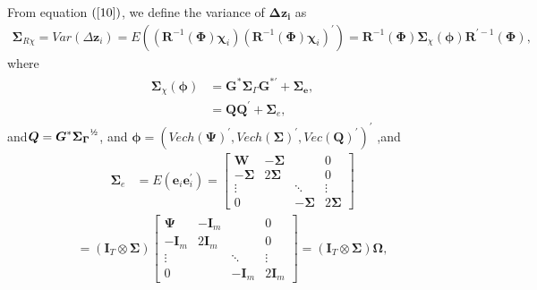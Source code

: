 \documentclass[12pt,a4paper,hyperref]{article}
\begin{document}
From equation $(\ref{10})$, we define the variance of $\boldsymbol{\Delta z_{i}}$ as
\begin{align}
\boldsymbol{\Sigma}_{R\chi}=Var(\Delta \boldsymbol{z}_{i})=E\left(\left( \boldsymbol{R}^{-1}(\boldsymbol{\Phi}) \boldsymbol{\chi}_{i}\right)\left( \boldsymbol{R}^{-1}(\boldsymbol{\Phi})\boldsymbol{\chi}_{i}\right)^{'}\right)=\boldsymbol{R}^{-1}(\boldsymbol{\Phi}) \boldsymbol{\Sigma}_{\chi}(\boldsymbol{\phi}) \boldsymbol{R}^{'-1}(\boldsymbol{\Phi}),
\end{align}
where
\begin{align}
\begin{split}
\boldsymbol{\Sigma}_{\chi}(\boldsymbol{\phi})&= \boldsymbol{G^{\ast}} \boldsymbol{\Sigma}_{\Gamma}\boldsymbol{G}^{\ast '}+\boldsymbol{\Sigma_{e}}, \\
&= \boldsymbol{QQ}^{'}+\boldsymbol{\Sigma}_{e}, \label{11}
\end{split}
\end{align}
 and$\boldsymbol{Q}=  \boldsymbol{G}^{\ast}\boldsymbol{\Sigma_{\Gamma}}^{\text{\textonehalf}}$, and $ \boldsymbol{\phi}=\left( Vech(\boldsymbol{\Psi})^{'}, Vech(\boldsymbol{\Sigma})^{'}, Vec(\boldsymbol{Q})^{'}   \right)^{'}$
,and
\begin{align}
\boldsymbol{\Sigma}_{e}&=E\left(\boldsymbol{e}_{i}\boldsymbol{e}_{i}^{'} \right)=
\begin{bmatrix}
\boldsymbol{W} &-\boldsymbol{\Sigma} & &0 \\
-\boldsymbol{\Sigma} & 2\boldsymbol{\Sigma}&  & 0 \\
\vdots&                  &  \ddots                 &\vdots \\
0  &                           &          -\boldsymbol{\Sigma}& 2\boldsymbol{\Sigma}
\end{bmatrix}
\end{align}
\begin{align}
=\left(\boldsymbol{I}_{T}\otimes \boldsymbol{\Sigma} \right)
\begin{bmatrix}
\boldsymbol{\Psi} &-\boldsymbol{I}_{m} & &0 \\
-\boldsymbol{I}_{m} & 2\boldsymbol{I}_{m}&  & 0 \\
\vdots&                  &  \ddots                 &\vdots \\
0  &                           &          -\boldsymbol{I}_{m}& 2\boldsymbol{I}_{m}
\end{bmatrix}
=\left(\boldsymbol{I}_{T}\otimes \boldsymbol{\Sigma} \right) \boldsymbol{\Omega},
\end{align}
\end{document}
